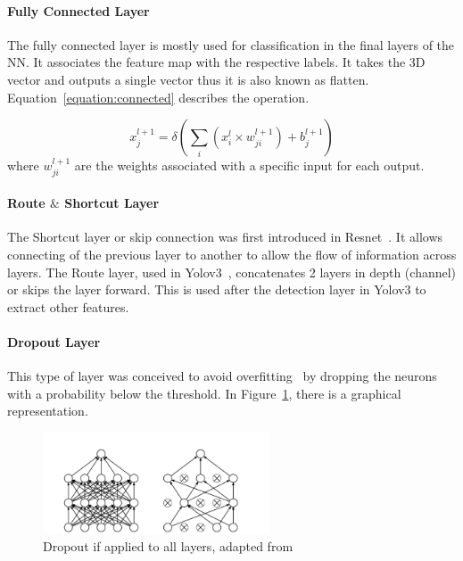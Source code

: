 \paragraph{Fully Connected Layer}

The fully connected layer is mostly used for classification in the final layers
of the NN. It associates the feature map with the respective labels.  It takes the
3D vector and outputs a single vector thus it is also known as flatten.
Equation~\ref{equation:connected} describes the operation.

\begin{equation} \label{equation:connected}
     \displaystyle x_{j}^{l+1}=\delta (\sum_{i}(x_{i}^{l} \times w_{ji}^{l+1})+ b_{j}^{l+1})
\end{equation}
where $w_{ji}^{l+1}$ are the weights associated with a specific input for each output.


\paragraph{Route $\&$ Shortcut Layer}

The Shortcut layer or skip connection was first introduced in
Resnet~\cite{resnet}.  It allows connecting of the previous layer to another to
allow the flow of information across layers.  The Route layer, used in
Yolov3~\cite{yolov3}, concatenates 2 layers in depth (channel) or skips the
layer forward. This is used after the detection layer in Yolov3 to extract other
features.

\paragraph{Dropout Layer}

This type of layer was conceived to avoid overfitting~\cite{Dropout} by dropping
the neurons with a probability below the threshold. In
Figure~\ref{figure:Dropout}, there is a graphical representation.
\begin{figure}[!htbp]
    \centering
    \includegraphics[width=0.6\textwidth]{Figures/dropout.png}
    \caption{Dropout if applied to all layers, adapted from~\cite{Dropout}}
    \label{figure:Dropout}
\end{figure} 

